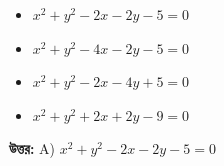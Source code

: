 \documentclass[12pt, a4paper]{article}
\begin{document}
\begin{itemize}[label={}, leftmargin=1cm, itemsep=0.5em]
    \item[\textbf{A)}] $x^2 + y^2 - 2x - 2y - 5 = 0$
    \item[\textbf{B)}] $x^2 + y^2 - 4x - 2y - 5 = 0$
    \item[\textbf{C)}] $x^2 + y^2 - 2x - 4y + 5 = 0$
    \item[\textbf{D)}] $x^2 + y^2 + 2x + 2y - 9 = 0$
\end{itemize}

\vspace{0.5em}
\begin{tcolorbox}[answerbox]
    \textbf{\color{success} উত্তর:} A) $x^2 + y^2 - 2x - 2y - 5 = 0$
\end{tcolorbox}
\vspace{1em}
\end{document}
